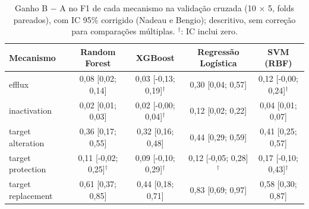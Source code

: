 \begin{table}[htbp]
  \centering
  \caption{Ganho B $-$ A no F1 de cada mecanismo na validação cruzada (10 $\times$ 5, folds pareados), com IC 95\% corrigido (Nadeau e Bengio); descritivo, sem correção para comparações múltiplas. $^\dagger$: IC inclui zero.}
  \label{tab:ganho_por_classe_cv}
  \begin{tabular}{lcccc}
    \toprule
    Mecanismo & Random Forest & XGBoost & Regressão Logística & SVM (RBF) \\
    \midrule
    efflux & 0,08 [0,02; 0,14] & 0,03 [-0,13; 0,19]$^\dagger$ & 0,30 [0,04; 0,57] & 0,12 [-0,00; 0,24]$^\dagger$ \\
    inactivation & 0,02 [0,01; 0,03] & 0,02 [-0,00; 0,04]$^\dagger$ & 0,12 [0,02; 0,22] & 0,04 [0,01; 0,07] \\
    target alteration & 0,36 [0,17; 0,55] & 0,32 [0,16; 0,48] & 0,44 [0,29; 0,59] & 0,41 [0,25; 0,57] \\
    target protection & 0,11 [-0,02; 0,25]$^\dagger$ & 0,09 [-0,10; 0,29]$^\dagger$ & 0,12 [-0,05; 0,28]$^\dagger$ & 0,17 [-0,10; 0,43]$^\dagger$ \\
    target replacement & 0,61 [0,37; 0,85] & 0,44 [0,18; 0,71] & 0,83 [0,69; 0,97] & 0,58 [0,30; 0,87] \\
    \bottomrule
  \end{tabular}
\end{table}
